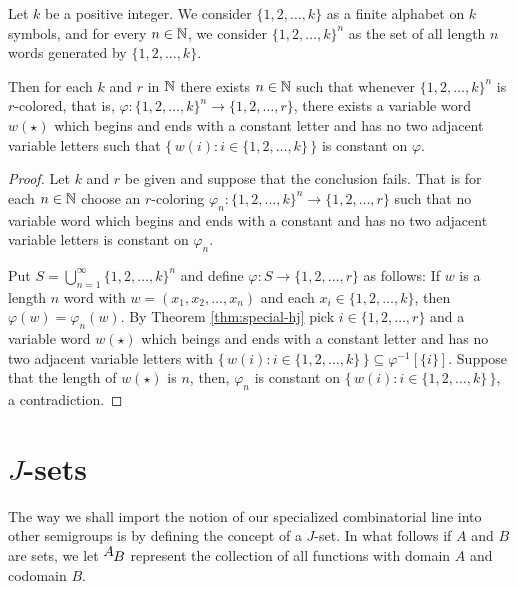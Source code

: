 \begin{thm}
  \label{thm:finitary-shj}
  Let $k$ be a positive integer.
  We consider $\{1, 2, \ldots, k\}$ as a finite alphabet on $k$ symbols, and for every $n \in \mathbb{N}$, we consider $\{1, 2, \ldots, k\}^n$ as the set of all length $n$ words generated by $\{1, 2, \ldots, k\}$.

  Then for each $k$ and $r$ in $\mathbb{N}$ there exists $n \in \mathbb{N}$ such that whenever $\{1, 2, \ldots, k\}^n$ is $r$-colored, that is, $\varphi \colon \{1, 2, \ldots, k\}^n \to \{1, 2, \ldots, r\}$, there exists a variable word $w(\star)$ which begins and ends with a constant letter and has no two adjacent variable letters such that $\bigl\{\, w(i) : i \in \{1, 2, \ldots, k\} \,\bigr\}$ is constant on $\varphi$.
\end{thm}
\begin{proof}
  Let $k$ and $r$ be given and suppose that the conclusion fails.
  That is for each $n \in \mathbb{N}$ choose an $r$-coloring $\varphi_n \colon \{1, 2, \ldots, k\}^n \to \{1, 2, \ldots, r\}$ such that no variable word which begins and ends with a constant and has no two adjacent variable letters is constant on $\varphi_n$.
  
  Put $S = \bigcup_{n=1}^\infty \{1, 2, \ldots, k\}^n$ and define $\varphi \colon S \to \{1, 2, \ldots, r\}$ as follows: If $w$ is a length $n$ word with $w = (x_1, x_2, \ldots, x_n)$ and each $x_i \in \{1, 2, \ldots, k\}$, then $\varphi(w) = \varphi_n(w)$.
  By Theorem \ref{thm:special-hj} pick $i \in \{1, 2, \ldots, r\}$ and a variable word $w(\star)$ which beings and ends with a constant letter and has no two adjacent variable letters with $\bigl\{\, w(i) : i \in \{1, 2, \ldots, k\} \,\bigr\} \subseteq \varphi^{-1}[\{i\}]$.
  Suppose that the length of $w(\star)$ is $n$, then, $\varphi_n$ is constant on $\bigl\{\, w(i) : i \in \{1, 2, \ldots, k\} \,\bigr\}$, a contradiction. 
\end{proof}

\section{$J$-sets}
The way we shall import the notion of our specialized combinatorial line into other semigroups is by defining the concept of a $J$-set. 
In what follows if $A$ and $B$ are sets, we let $\hbox{${}^{\hbox{$A$}}\hskip -1 pt B$}$ represent the collection of all functions with domain $A$ and codomain $B$.

